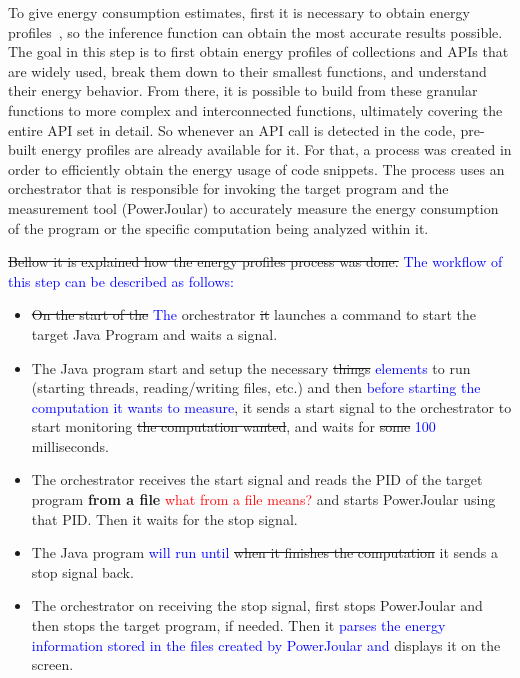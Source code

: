 \documentclass[sigplan]{acmart}
\newcommand{\wnote}[1]{\textcolor{blue}{#1}}
\begin{document}
To give energy consumption estimates, first it is necessary to obtain energy profiles~\cite{10.1145/2884781.2884869,8816747}, so the inference function can obtain the most accurate results possible. The goal in this step is to first obtain energy profiles of collections and APIs that are widely used, break them down to their smallest functions, and understand their energy behavior. From there, it is possible to build from these granular functions to more complex and interconnected functions, ultimately covering the entire API set in detail. So whenever an API call is detected in the code, pre-built energy profiles are already available for it.
For that, a process was created in order to efficiently obtain the energy usage of code snippets.
The process uses an orchestrator that is responsible for invoking the target program and the measurement tool (PowerJoular) to accurately measure the energy consumption of the program or the specific computation being analyzed within it.

\st{Bellow it is explained how the energy profiles process was done.}
\wnote{The workflow of this step can be described as follows:}

\begin{itemize}
  \item \st{On the start of the} \wnote{The} orchestrator \st{it} launches a command to start the target Java Program and waits a signal.
  \item The Java program start and setup the necessary \st{things} \wnote{elements} to run (starting threads, reading/writing files, etc.) and then \wnote{before starting the computation it wants to measure}, it sends a start signal to the orchestrator to start monitoring \st{the computation wanted}, and waits for \st{some} \wnote{100} milliseconds. 
  \item The orchestrator receives the start signal and reads the PID of the target program \textbf{from a file} \textcolor{red}{what from a file means?} and starts PowerJoular using that PID. Then it waits for the stop signal.
  \item The Java program \wnote{will run until} \st{when it finishes the computation} it sends a stop signal back.
  \item The orchestrator on receiving the stop signal, first stops PowerJoular and then stops the target program, if needed. Then it \wnote{parses the energy information stored in the files created by PowerJoular and} displays it on the screen.
\end{itemize}
\end{document}
